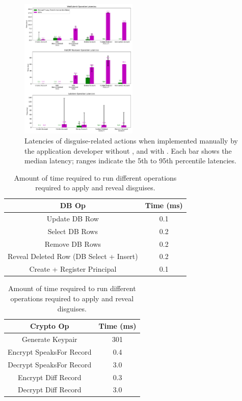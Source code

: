 \begin{figure}[t!]
    \centering
    \includegraphics[width=0.5\textwidth]{figs/client_op_stats}
    \caption{Latencies of disguise-related actions when implemented manually by the
    application developer without \sys, and with \sys.
    Each bar shows the median latency; ranges indicate the 5th to 95th
    percentile latencies.  }
    \label{fig:client_opstats}
\end{figure}

\begin{table}[h!]
\begin{center}
\begin{tabular}{ c c }
\textbf{DB Op} & \textbf{Time (ms)}\\
\hline
Update DB Row & 0.1\\
Select DB Rows & 0.2\\
Remove DB Rows & 0.2\\
Reveal Deleted Row (DB Select + Insert) & 0.2 \\
Create + Register Principal & 0.1\\
\end{tabular}
\quad
\begin{tabular}{ c c }
\textbf{Crypto Op} & \textbf{Time (ms)}\\
\hline
Generate Keypair & 301\\
Encrypt SpeaksFor Record & 0.4\\
Decrypt SpeaksFor Record & 3.0\\
Encrypt Diff Record & 0.3\\
Decrypt Diff Record & 3.0\\
\end{tabular}
\end{center}
\caption{Amount of time required to run different operations required to apply and reveal disguises.}
\label{tab:opstats}
\end{table}

